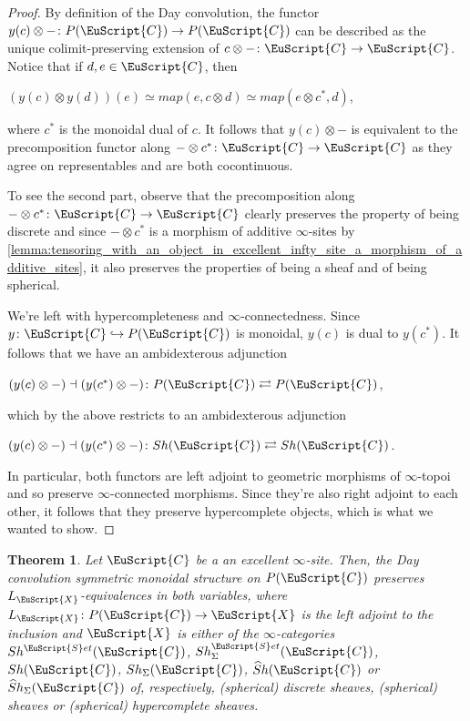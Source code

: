 \documentclass[oneside,a4paper]{amsart}
\newcommand{\euscr}[1]{\EuScript{#1}} %
\newcommand{\ccat}{\euscr{C}} %
\newcommand{\sets}{\euscr{S}et} %
\newcommand{\hpsheaves}{\widehat{S}h} %
\theoremstyle{plain}
\newtheorem{thm}{Theorem}[section]
\theoremstyle{definition}
\theoremstyle{remark}
\begin{document}
\begin{proof}
By definition of the Day convolution, the functor $y(c) \otimes - \colon P(\ccat) \rightarrow P(\ccat)$ can be described as the unique colimit-preserving extension of $c \otimes - \colon \ccat \rightarrow \ccat$. Notice that if $d, e \in \ccat$, then 

\begin{center}
$(y(c) \otimes y(d))(e) \simeq map(e, c \otimes d) \simeq map(e \otimes c^{*}, d)$,
\end{center}
where $c^{*}$ is the monoidal dual of $c$. It follows that $y(c) \otimes -$ is equivalent to the precomposition functor along $- \otimes c^{*} \colon \ccat \rightarrow \ccat$ as they agree on representables and are both cocontinuous.

To see the second part, observe that the precomposition along $- \otimes c^{*} \colon \ccat \rightarrow \ccat$ clearly preserves the property of being discrete and since $- \otimes c^{*}$ is a morphism of additive $\infty$-sites by \cref{lemma:tensoring_with_an_object_in_excellent_infty_site_a_morphism_of_additive_sites}, it also preserves the properties of being a sheaf and of being spherical. 

We're left with hypercompleteness and $\infty$-connectedness. Since $y \colon \ccat \hookrightarrow P(\ccat)$ is monoidal, $y(c)$ is dual to $y(c^{*})$. It follows that we have an ambidexterous adjunction 

\begin{center}
$(y(c) \otimes -) \dashv (y(c^{*}) \otimes -) \colon P(\ccat) \rightleftarrows P(\ccat)$,
\end{center}
which by the above restricts to an ambidexterous adjunction 

\begin{center}
$(y(c) \otimes -) \dashv (y(c^{*}) \otimes -) \colon Sh(\ccat) \rightleftarrows Sh(\ccat)$.
\end{center}
In particular, both functors are left adjoint to geometric morphisms of $\infty$-topoi and so preserve $\infty$-connected morphisms. Since they're also right adjoint to each other, it follows that they preserve hypercomplete objects, which is what we wanted to show. 
\end{proof}

\begin{thm}
\label{thm:day_convolution_compatible_with_different_kinds_of_equivalences}
Let $\ccat$ be a an excellent $\infty$-site. Then, the Day convolution symmetric monoidal structure on $P(\ccat)$ preserves $L_{\euscr{X}}$-equivalences in both variables, where $L_{\euscr{X}} \colon P(\ccat) \rightarrow \euscr{X}$ is the left adjoint to the inclusion and $\euscr{X}$ is either of the $\infty$-categories $Sh^{\sets}(\ccat)$, $Sh^{\sets}_{\Sigma}(\ccat)$, $Sh(\ccat)$, $Sh_{\Sigma}(\ccat)$, $\hpsheaves(\ccat)$ or $\hpsheaves_{\Sigma}(\ccat)$ of, respectively, (spherical) discrete sheaves, (spherical) sheaves or (spherical) hypercomplete sheaves.
\end{thm}
\end{document}
